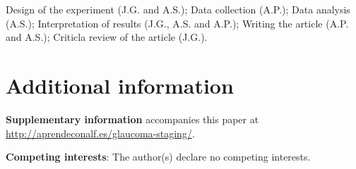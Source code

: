 \documentclass[fleqn,10pt]{wlscirep}
\begin{document}
Design of the experiment (J.G. and A.S.);  Data collection (A.P.); Data analysis (A.S.); Interpretation of results (J.G., A.S. and A.P.); Writing the article (A.P. and A.S.); Criticla review of the article (J.G.).

\section*{Additional information}
\textbf{Supplementary information} accompanies this paper at \url{http://aprendeconalf.es/glaucoma-staging/}.

\medskip

\noindent\textbf{Competing interests}: The author(s) declare no competing interests.
\end{document}
